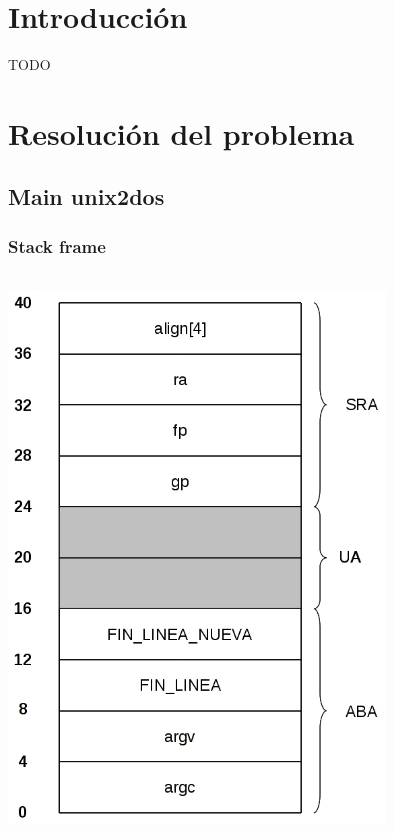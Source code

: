 \documentclass[a4paper,10pt]{article}
\begin{document}

\setcounter{page}{2}

\newpage
\thispagestyle{empty}
\tableofcontents

\newpage
\section{Introducci\'on}
  TODO

\section{Resoluci\'on del problema}

  \subsection{Main unix2dos}
    \subsubsection{Stack frame}
      \begin{center}
	\includegraphics[width=10cm, height=15cm]{DibujosStackFrame/stack-unix2dos(main).jpg}
      \end{center}
\end{document}
